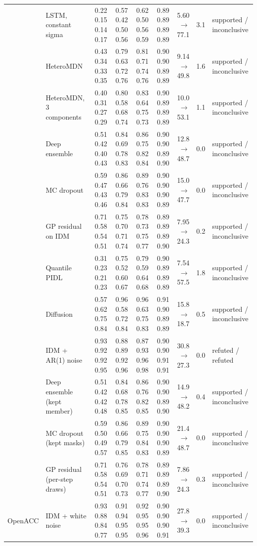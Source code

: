 \begin{longtable}{llrrrrrrl}
 & LSTM, constant sigma & 0.22 0.15 0.14 0.17 & 0.57 0.42 0.50 0.56 & 0.62 0.50 0.56 0.59 & 0.89 0.89 0.89 0.89 & 5.60 $\rightarrow$ 77.1 & 3.1 & supported / inconclusive \\
 & HeteroMDN & 0.43 0.34 0.33 0.35 & 0.79 0.63 0.72 0.76 & 0.81 0.71 0.74 0.76 & 0.90 0.90 0.89 0.89 & 9.14 $\rightarrow$ 49.8 & 1.6 & supported / inconclusive \\
 & HeteroMDN, 3 components & 0.40 0.31 0.27 0.29 & 0.80 0.58 0.68 0.74 & 0.83 0.64 0.75 0.73 & 0.90 0.89 0.89 0.89 & 10.0 $\rightarrow$ 53.1 & 1.1 & supported / inconclusive \\
 & Deep ensemble & 0.51 0.42 0.40 0.43 & 0.84 0.69 0.78 0.83 & 0.86 0.75 0.82 0.84 & 0.90 0.90 0.89 0.90 & 12.8 $\rightarrow$ 48.7 & 0.0 & supported / inconclusive \\
 & MC dropout & 0.59 0.47 0.43 0.46 & 0.86 0.66 0.79 0.84 & 0.89 0.76 0.83 0.83 & 0.90 0.90 0.90 0.89 & 15.0 $\rightarrow$ 47.7 & 0.0 & supported / inconclusive \\
 & GP residual on IDM & 0.71 0.58 0.54 0.51 & 0.75 0.70 0.71 0.74 & 0.78 0.73 0.75 0.77 & 0.89 0.89 0.89 0.90 & 7.95 $\rightarrow$ 24.3 & 0.2 & supported / inconclusive \\
 & Quantile PIDL & 0.31 0.23 0.21 0.23 & 0.75 0.52 0.60 0.67 & 0.79 0.59 0.64 0.68 & 0.90 0.89 0.89 0.89 & 7.54 $\rightarrow$ 57.5 & 1.8 & supported / inconclusive \\
 & Diffusion & 0.57 0.62 0.75 0.84 & 0.96 0.58 0.72 0.84 & 0.96 0.63 0.75 0.83 & 0.91 0.90 0.89 0.89 & 15.8 $\rightarrow$ 18.7 & 0.5 & supported / inconclusive \\
 & IDM + AR(1) noise & 0.93 0.92 0.92 0.95 & 0.88 0.89 0.92 0.96 & 0.87 0.93 0.96 0.98 & 0.90 0.90 0.91 0.91 & 30.8 $\rightarrow$ 27.3 & 0.0 & refuted / refuted \\
 & Deep ensemble (kept member) & 0.51 0.42 0.42 0.48 & 0.84 0.68 0.78 0.85 & 0.86 0.76 0.82 0.85 & 0.90 0.90 0.89 0.90 & 14.9 $\rightarrow$ 48.2 & 0.4 & supported / inconclusive \\
 & MC dropout (kept masks) & 0.59 0.50 0.49 0.57 & 0.86 0.66 0.79 0.85 & 0.89 0.75 0.84 0.83 & 0.90 0.90 0.90 0.89 & 21.4 $\rightarrow$ 48.7 & 0.0 & supported / inconclusive \\
 & GP residual (per-step draws) & 0.71 0.58 0.54 0.51 & 0.76 0.69 0.70 0.73 & 0.78 0.71 0.74 0.77 & 0.89 0.89 0.89 0.90 & 7.86 $\rightarrow$ 24.3 & 0.3 & supported / inconclusive \\
\midrule
OpenACC & IDM + white noise & 0.93 0.88 0.84 0.77 & 0.91 0.94 0.95 0.95 & 0.92 0.95 0.95 0.96 & 0.90 0.90 0.90 0.91 & 27.8 $\rightarrow$ 39.3 & 0.0 & supported / inconclusive \\

\end{longtable}
